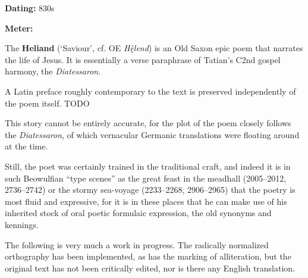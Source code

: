 
\begin{flushright}%
\textbf{Dating:} 830s

\textbf{Meter:} \Fornyrdislag%
\end{flushright}%

The \textbf{Heliand} (‘Saviour’, cf. OE \emph{Hę̂lend}) is an Old Saxon epic poem that narrates the life of Jesus.  It is essentially a verse paraphrase of Tatian’s C2nd gospel harmony, the \emph{Diatessaron}.

A Latin preface roughly contemporary to the text is preserved independently of the poem itself. TODO

This story cannot be entirely accurate, for the plot of the poem closely follows the \emph{Diatessaron}, of which vernacular Germanic translations were floating around at the time.

Still, the poet was certainly trained in the traditional craft, and indeed it is in such Beowulfian “type scenes” as the great feast in the meadhall (2005–2012, 2736–2742) or the stormy sea-voyage (2233–2268, 2906–2965) that the poetry is most fluid and expressive, for it is in these places that he can make use of his inherited stock of oral poetic formulaic expression, the old synonyms and kennings.


The following is very much a work in progress.  The radically normalized orthography has been implemented, as has the marking of alliteration, but the original text has not been critically edited, nor is there any English translation.

